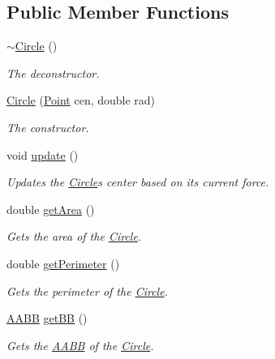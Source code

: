 \subsection*{Public Member Functions}
\begin{DoxyCompactItemize}
\item 
\mbox{\hyperlink{class_circle_ae3f30436e645d73e368e8ee55f8d1650}{$\sim$\+Circle}} ()
\begin{DoxyCompactList}\small\item\em The deconstructor. \end{DoxyCompactList}\item 
\mbox{\hyperlink{class_circle_ac6202983dbc02af4cbb80b466c657a52}{Circle}} (\mbox{\hyperlink{class_point}{Point}} cen, double rad)
\begin{DoxyCompactList}\small\item\em The constructor. \end{DoxyCompactList}\item 
void \mbox{\hyperlink{class_circle_aa978eeba0712d29dfae842733bf6c2c7}{update}} ()
\begin{DoxyCompactList}\small\item\em Updates the \mbox{\hyperlink{class_circle}{Circle}}\textquotesingle{}s center based on its current force. \end{DoxyCompactList}\item 
double \mbox{\hyperlink{class_circle_a99fe1cbabbf3a9ccae51832376c5e8d4}{get\+Area}} ()
\begin{DoxyCompactList}\small\item\em Gets the area of the \mbox{\hyperlink{class_circle}{Circle}}. \end{DoxyCompactList}\item 
double \mbox{\hyperlink{class_circle_afee5f4743c89e48e462e5f56aa605669}{get\+Perimeter}} ()
\begin{DoxyCompactList}\small\item\em Gets the perimeter of the \mbox{\hyperlink{class_circle}{Circle}}. \end{DoxyCompactList}\item 
\mbox{\hyperlink{class_a_a_b_b}{A\+A\+BB}} \mbox{\hyperlink{class_circle_a7df161b9fa0dce04ed01f7924658faf3}{get\+BB}} ()
\begin{DoxyCompactList}\small\item\em Gets the \mbox{\hyperlink{class_a_a_b_b}{A\+A\+BB}} of the \mbox{\hyperlink{class_circle}{Circle}}. \end{DoxyCompactList}\item 

\end{DoxyCompactItemize}
